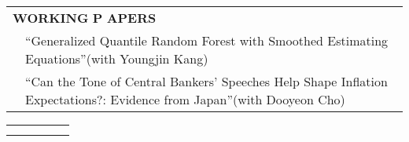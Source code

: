 \documentclass[10pt]{article}
\begin{document}
\begin{center}
\begin{tabular}{llllr}
\multicolumn{5}{l}{{\Large \textbf{W}}\textbf{ORKING} {\Large \textbf{P}}%
\textbf{APERS}} \vspace{0.1cm}\\
& \multicolumn{4}{l}{\textquotedblleft Generalized Quantile Random Forest with Smoothed Estimating Equations\textquotedblright (with Youngjin Kang)} \\
& \multicolumn{4}{l}{\textquotedblleft Can the Tone of Central Bankers’ Speeches Help
Shape Inflation Expectations?: Evidence from Japan\textquotedblright (with Dooyeon Cho)}
\end{tabular}

\clearpage

\begin{tabular}{ccccc}
\hline
\multicolumn{5}{p{460pt}}{}\\\\
\end{tabular}


\end{center}
\end{document}

